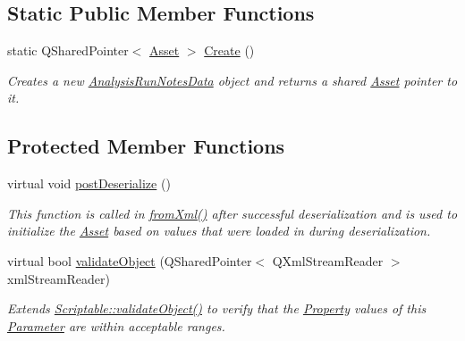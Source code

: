 \subsection*{Static Public Member Functions}
\begin{DoxyCompactItemize}
\item 
\hypertarget{class_picto_1_1_analysis_run_notes_data_ab97b6e782c0861f522e7fc5d6e8af592}{static Q\-Shared\-Pointer$<$ \hyperlink{class_picto_1_1_asset}{Asset} $>$ \hyperlink{class_picto_1_1_analysis_run_notes_data_ab97b6e782c0861f522e7fc5d6e8af592}{Create} ()}\label{class_picto_1_1_analysis_run_notes_data_ab97b6e782c0861f522e7fc5d6e8af592}

\begin{DoxyCompactList}\small\item\em Creates a new \hyperlink{class_picto_1_1_analysis_run_notes_data}{Analysis\-Run\-Notes\-Data} object and returns a shared \hyperlink{class_picto_1_1_asset}{Asset} pointer to it. \end{DoxyCompactList}\end{DoxyCompactItemize}
\subsection*{Protected Member Functions}
\begin{DoxyCompactItemize}
\item 
virtual void \hyperlink{class_picto_1_1_analysis_run_notes_data_a2be0449a871ae70d98d5b53c45aa3857}{post\-Deserialize} ()
\begin{DoxyCompactList}\small\item\em This function is called in \hyperlink{class_picto_1_1_asset_a8bed4da09ecb1c07ce0dab313a9aba67}{from\-Xml()} after successful deserialization and is used to initialize the \hyperlink{class_picto_1_1_asset}{Asset} based on values that were loaded in during deserialization. \end{DoxyCompactList}\item 
virtual bool \hyperlink{class_picto_1_1_analysis_run_notes_data_ae58942e718660c9caeb73d2dab934540}{validate\-Object} (Q\-Shared\-Pointer$<$ Q\-Xml\-Stream\-Reader $>$ xml\-Stream\-Reader)
\begin{DoxyCompactList}\small\item\em Extends \hyperlink{class_picto_1_1_scriptable_ab6e2944c43a3b5d418bf7b251594386d}{Scriptable\-::validate\-Object()} to verify that the \hyperlink{class_picto_1_1_property}{Property} values of this \hyperlink{class_picto_1_1_parameter}{Parameter} are within acceptable ranges. \end{DoxyCompactList}\end{DoxyCompactItemize}
